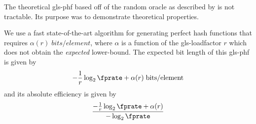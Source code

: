 \documentclass[ ../main.tex]{subfiles}
\begin{document}
%


The theoretical \gls{gls-phf} based off of the random oracle as described by \cite{oph} is not tractable. Its purpose was to demonstrate theoretical properties.

We use a fast state-of-the-art algorithm \cite{chd} for generating perfect hash functions that requires $\alpha(r) \; \si{bits \per element}$, where $\alpha$ is a function of the \gls{gls-loadfactor} $r$ which does not obtain the \emph{expected} lower-bound. The expected bit length of this \gls{gls-phf} is given by
\begin{equation}
    -\frac{1}{r} \log_2 \fprate + \alpha(r) \; \si{bits \per element}
\end{equation}
and its absolute efficiency is given by
\begin{equation}
    \frac{-\frac{1}{r}\log_2 \fprate + \alpha(r)}{-\log_2 \fprate}
\end{equation}
\end{document}
